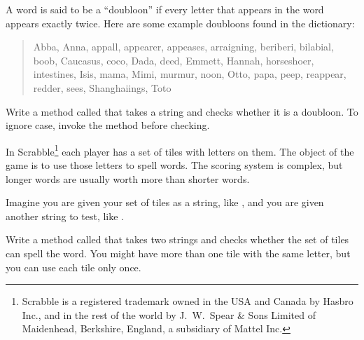 \begin{exercise}  %
\label{doubloon}


A word is said to be a ``doubloon'' if every letter that appears in the word appears exactly twice.
Here are some example doubloons found in the dictionary:

\begin{quote}
Abba, Anna, appall, appearer, appeases, arraigning, beriberi, bilabial, boob, Caucasus, coco, Dada, deed, Emmett, Hannah, horseshoer, intestines, Isis, mama, Mimi, murmur, noon, Otto, papa, peep, reappear, redder, sees, Shanghaiings, Toto
\end{quote}

Write a method called  that takes a string and checks whether it is a doubloon.
To ignore case, invoke the  method before checking.
\end{exercise}


\begin{exercise}  %


In Scrabble\footnote{Scrabble is a registered trademark owned in the USA and Canada by Hasbro Inc., and in the rest of the world by J.\ W.\ Spear \& Sons Limited of Maidenhead, Berkshire, England, a subsidiary of Mattel Inc.} each player has a set of tiles with letters on them.
The object of the game is to use those letters to spell words.
The scoring system is complex, but longer words are usually worth more than shorter words.


Imagine you are given your set of tiles as a string, like , and you are given another string to test, like .

Write a method called  that takes two strings and checks whether the set of tiles can spell the word.
You might have more than one tile with the same letter, but you can use each tile only once.

\end{exercise}


